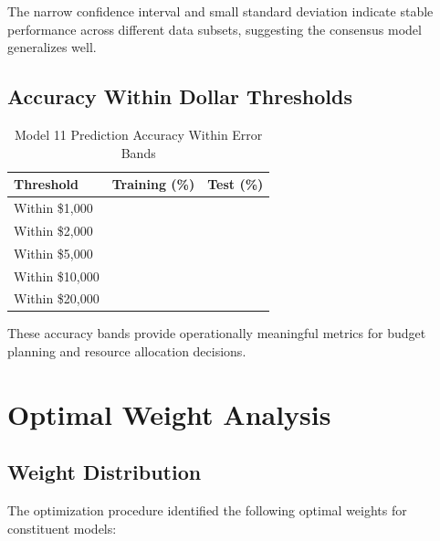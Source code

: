 The narrow confidence interval and small standard deviation indicate stable performance across different data subsets, suggesting the consensus model generalizes well.

\subsection{Accuracy Within Dollar Thresholds}

\begin{table}[h]
\centering
\caption{Model 11 Prediction Accuracy Within Error Bands}
\label{tab:model11_accuracy_bands}
\begin{tabular}{lcc}
\toprule
\textbf{Threshold} & \textbf{Training (\%)} & \textbf{Test (\%)} \\
\midrule
Within \$1,000 & \ModelElevenWithinOneKTrain{} & \ModelElevenWithinOneK{} \\
Within \$2,000 & \ModelElevenWithinTwoKTrain{} & \ModelElevenWithinTwoK{} \\
Within \$5,000 & \ModelElevenWithinFiveKTrain{} & \ModelElevenWithinFiveK{} \\
Within \$10,000 & \ModelElevenWithinTenKTrain{} & \ModelElevenWithinTenK{} \\
Within \$20,000 & \ModelElevenWithinTwentyKTrain{} & \ModelElevenWithinTwentyK{} \\
\bottomrule
\end{tabular}
\end{table}

These accuracy bands provide operationally meaningful metrics for budget planning and resource allocation decisions.

\section{Optimal Weight Analysis}

\subsection{Weight Distribution}

The optimization procedure identified the following optimal weights for constituent models:

